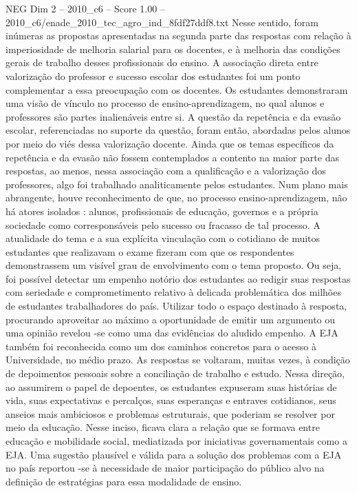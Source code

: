 \begin{textsample}{NEG Dim 2 – 2010\_c6 – Score 1.00 – 2010\_c6/enade\_2010\_tec\_agro\_ind\_8fdf27ddf8.txt}
Nesse sentido, foram inúmeras as propostas apresentadas na segunda parte das respostas com relação à imperiosidade de melhoria salarial para os docentes, e à melhoria das condições gerais de trabalho desses profissionais do ensino.
A associação direta entre valorização do professor e sucesso escolar dos estudantes foi um ponto complementar a essa preocupação com os docentes.
Os estudantes demonstraram uma visão de vínculo no processo de ensino-aprendizagem, no qual alunos e professores são partes inalienáveis entre si.
A questão da repetência e da evasão escolar, referenciadas no suporte da questão, foram então, abordadas pelos alunos por meio do viés dessa valorização docente.
Ainda que os temas específicos da repetência e da evasão não fossem contemplados a contento na maior parte das respostas, ao menos, nessa associação com a qualificação e a valorização dos professores, algo foi trabalhado analiticamente pelos estudantes.
Num plano mais abrangente, houve reconhecimento de que, no processo ensino-aprendizagem, não há atores isolados : alunos, profissionais de educação, governos e a própria sociedade como corresponsáveis pelo sucesso ou fracasso de tal processo.
A atualidade do tema e a sua explícita vinculação com o cotidiano de muitos estudantes que realizavam o exame fizeram com que os respondentes demonstrassem um visível grau de envolvimento com o tema proposto.
Ou seja, foi possível detectar um empenho notório dos estudantes ao redigir suas respostas com seriedade e comprometimento relativo à delicada problemática dos milhões de estudantes trabalhadores do país.
Utilizar todo o espaço destinado à resposta, procurando aproveitar ao máximo a oportunidade de emitir um argumento ou uma opinião revelou -se como uma das evidências do aludido empenho.
A EJA também foi reconhecida como um dos caminhos concretos para o acesso à Universidade, no médio prazo.
As respostas se voltaram, muitas vezes, à condição de depoimentos pessoais sobre a conciliação de trabalho e estudo.
Nessa direção, ao assumirem o papel de depoentes, os estudantes expuseram suas histórias de vida, suas expectativas e percalços, suas esperanças e entraves cotidianos, seus anseios mais ambiciosos e problemas estruturais, que poderiam se resolver por meio da educação.
Nesse inciso, ficava clara a relação que se formava entre educação e mobilidade social, mediatizada por iniciativas governamentais como a EJA.
Uma sugestão plausível e válida para a solução dos problemas com a EJA no país reportou -se à necessidade de maior participação do público alvo na definição de estratégias para essa modalidade de ensino.

\end{textsample}

